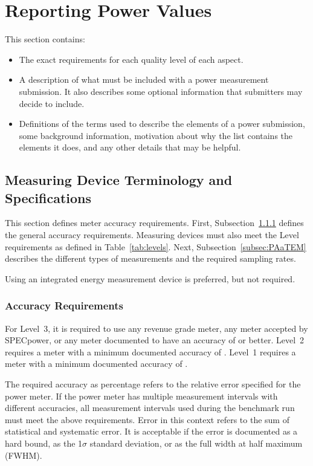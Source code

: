 \chapter{Reporting Power Values } %
\label{sec:reporting}

This section contains:
\begin{itemize}
 \item The exact requirements for each quality level of each aspect.
 \item A description of what must be included with a power measurement submission.
       It also describes some optional information that submitters may decide to include.
 \item Definitions of the terms used to describe the elements of a power submission, some background information, motivation about why the list contains the elements it does, and any other details that may be helpful.
\end{itemize}

\section{Measuring Device Terminology and Specifications}
\label{sec:MDSpecs}
\label{sec:MDTerm}

This section defines meter accuracy requirements.
First, Subsection~\ref{subsec:accuracy} defines the general accuracy requirements.
Measuring devices must also meet the Level requirements as defined in Table~\ref{tab:levels}. %
Next, Subsection~\ref{subsec:PAaTEM} describes the different types of measurements and the required sampling rates. 

Using an integrated energy measurement device is preferred, but not required.

\subsection{Accuracy Requirements}
\label{subsec:accuracy}

For Level~3, it is required to use any revenue grade meter, any meter accepted by SPECpower, or any meter documented to have an accuracy of \SpecAccuracyLThree{} or better.
Level~2 requires a meter with a minimum documented accuracy of \SpecAccuracyLTwo{}.
Level~1 requires a meter with a minimum documented accuracy of \SpecAccuracyLOne{}.

The required accuracy as percentage refers to the relative error specified for the power meter.
If the power meter has multiple measurement intervals with different accuracies, all measurement intervals used during the benchmark run must meet the above requirements.
Error in this context refers to the sum of statistical and systematic error.
It is acceptable if the error is documented as a hard bound, as the 1$\sigma$ standard deviation, or as the full width at half maximum (FWHM).

